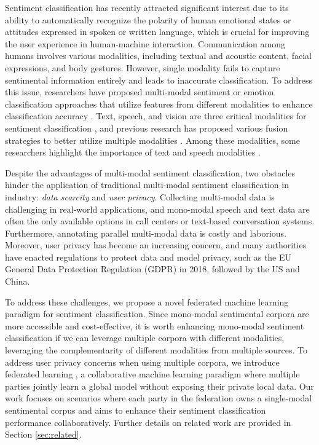 \documentclass[11pt]{article}
\begin{document}
Sentiment classification has recently attracted significant interest due to its ability to automatically recognize the polarity of human emotional states or attitudes expressed in spoken or written language, which is crucial for improving the user experience in human-machine interaction. Communication among humans involves various modalities, including textual and acoustic content, facial expressions, and body gestures. However, single modality fails to capture sentimental information entirely and leads to inaccurate classification. To address this issue, researchers have proposed multi-modal sentiment or emotion classification approaches that utilize features from different modalities to enhance classification accuracy \cite{Xueyang-li2019acoustic, Xueyang-aguilar2019multimodal}. Text, speech, and vision are three critical modalities for sentiment classification \cite{Xueyang-wollmer2013youtube, Xueyang-rozgic2012ensemble}, and previous research has proposed various fusion strategies to better utilize multiple modalities \cite{Xueyang-zadeh2017tensor, Xueyang-majumder2018multimodal}. Among these modalities, some researchers highlight the importance of text and speech modalities \cite{Xueyang-poria2017context}.

Despite the advantages of multi-modal sentiment classification, two obstacles hinder the application of traditional multi-modal sentiment classification in industry: \textit{data scarcity} and \textit{user privacy}. Collecting multi-modal data is challenging in real-world applications, and mono-modal speech and text data are often the only available options in call centers or text-based conversation systems. Furthermore, annotating parallel multi-modal data is costly and laborious. Moreover, user privacy has become an increasing concern, and many authorities have enacted regulations to protect data and model privacy, such as the EU General Data Protection Regulation (GDPR) \cite{Xueyang-voigt2017the76} in 2018, followed by the US and China.

To address these challenges, we propose a novel federated machine learning paradigm for sentiment classification. Since mono-modal sentimental corpora are more accessible and cost-effective, it is worth enhancing mono-modal sentiment classification if we can leverage multiple corpora with different modalities, leveraging the complementarity of different modalities from multiple sources. To address user privacy concerns when using multiple corpora, we introduce federated learning \cite{Xueyang-yang2019federated}, a collaborative machine learning paradigm where multiple parties jointly learn a global model without exposing their private local data. Our work focuses on scenarios where each party in the federation owns a single-modal sentimental corpus and aims to enhance their sentiment classification performance collaboratively. Further details on related work are provided in Section \ref{sec:related}.
\end{document}
